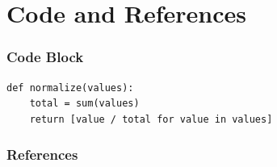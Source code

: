 \section{Code and References}

\begin{frame}[fragile]
  \frametitle{Code Block}
  \begin{lstlisting}[style=python]
def normalize(values):
    total = sum(values)
    return [value / total for value in values]
  \end{lstlisting}
\end{frame}

\begin{frame}[allowframebreaks]
  \frametitle{References}
  \printbibliography
\end{frame}
